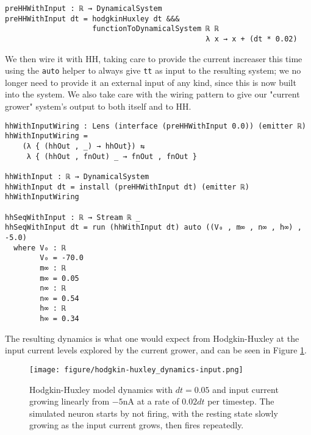 \begin{verbatim}
preHHWithInput : ℝ → DynamicalSystem
preHHWithInput dt = hodgkinHuxley dt &&& 
                    functionToDynamicalSystem ℝ ℝ 
                                              λ x → x + (dt * 0.02)
\end{verbatim}
We then wire it with HH, taking care to provide the current increaser this time using the \texttt{auto} helper to always give \texttt{tt} as input to the resulting system; we no longer need to provide it an external input of any kind, since this is now built into the system. We also take care with the wiring pattern to give our "current grower" system's output to both itself and to HH. 

\begin{verbatim}
hhWithInputWiring : Lens (interface (preHHWithInput 0.0)) (emitter ℝ)
hhWithInputWiring = 
    (λ { (hhOut , _) → hhOut}) ⇆ 
     λ { (hhOut , fnOut) _ → fnOut , fnOut }

hhWithInput : ℝ → DynamicalSystem
hhWithInput dt = install (preHHWithInput dt) (emitter ℝ) hhWithInputWiring

hhSeqWithInput : ℝ → Stream ℝ _
hhSeqWithInput dt = run (hhWithInput dt) auto ((V₀ , m∞ , n∞ , h∞) , -5.0)
  where V₀ : ℝ
        V₀ = -70.0
        m∞ : ℝ
        m∞ = 0.05
        n∞ : ℝ
        n∞ = 0.54
        h∞ : ℝ
        h∞ = 0.34
\end{verbatim}

The resulting dynamics is what one would expect from Hodgkin-Huxley at the input current levels explored by the current grower, and can be seen in Figure \ref{fig:hhdynamicsinput}.

\begin{figure}
    \centering
    \texttt{[image: figure/hodgkin-huxley\_dynamics-input.png]}
    \caption{Hodgkin-Huxley model dynamics with $dt = 0.05$ and input current growing linearly from $-5$nA at a rate of $0.02dt$ per timestep. The simulated neuron starts by not firing, with the resting state slowly growing as the input current grows, then fires repeatedly.}
    \label{fig:hhdynamicsinput}
\end{figure}

